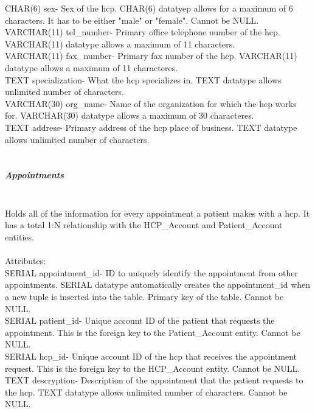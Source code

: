 \documentclass[12pt]{report}
\begin{document}
CHAR(6) sex- Sex of the hcp. CHAR(6) datatyep allows for a maximum of 6 characters.  It has to be either "male" or "female".  Cannot be NULL.\\

VARCHAR(11) tel_number- Primary office telephone number of the hcp.  VARCHAR(11) datatype allows a maximum of 11 characters.\\

VARCHAR(11) fax_number- Primary fax number of the hcp.  VARCHAR(11) datatype allows a maximum of 11 characteres.\\

TEXT specialization- What the hcp specializes in.  TEXT datatype allows unlimited number of characters.\\

VARCHAR(30) org_name- Name of the organization for which the hcp works for.  VARCHAR(30) datatype allows a maximum of 30 characteres.\\

TEXT address- Primary address of the hcp place of business.  TEXT datatype allows unlimited number of characters.\\ \\

\subparagraph{Appointments}\\
Holds all of the information for every appointment a patient makes with a hcp.  It has a total 1:N relationship with the HCP_Account and Patient_Account entities.\\ \\

Attributes:\\
SERIAL appointment_id- ID to uniquely identify the appointment from other appointments. SERIAL datatype automatically creates the appointment_id when a new tuple is inserted into the table.  Primary key of the table.  Cannot be NULL.\\

SERIAL patient_id-  Unique account ID of the patient that requests the appointment.  This is the foreign key to the Patient_Account entity.  Cannot be NULL.\\

SERIAL hcp_id- Unique account ID of the hcp that receives the appointment request.  This is the foreign key to the HCP_Account entity.  Cannot be NULL.\\

TEXT descryption- Description of the appointment that the patient requests to the hcp.  TEXT datatype allows unlimited number of characters.  Cannot be NULL.\\
\end{document}
